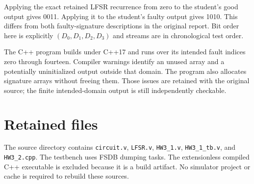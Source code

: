 \documentclass[11pt,a4paper]{article}
\begin{document}
Applying the exact retained LFSR recurrence from zero to the student's good output gives 0011. Applying it to the student's faulty output gives 1010. This differs from both faulty-signature descriptions in the original report. Bit order here is explicitly $(D_0,D_1,D_2,D_3)$ and streams are in chronological test order.

The C++ program builds under C++17 and runs over its intended fault indices zero through fourteen. Compiler warnings identify an unused array and a potentially uninitialized output outside that domain. The program also allocates signature arrays without freeing them. Those issues are retained with the original source; the finite intended-domain output is still independently checkable.

\section{Retained files}
The source directory contains \texttt{circuit.v}, \texttt{LFSR.v}, \texttt{HW3\_1.v}, \texttt{HW3\_1\_tb.v}, and \texttt{HW3\_2.cpp}. The testbench uses FSDB dumping tasks. The extensionless compiled C++ executable is excluded because it is a build artifact. No simulator project or cache is required to rebuild these sources.
\end{document}
